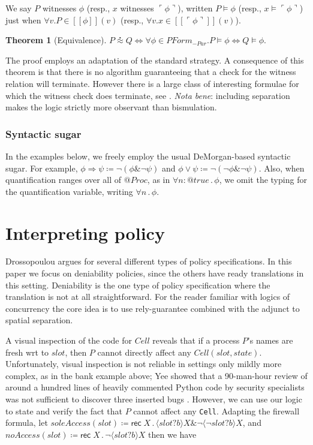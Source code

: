 \documentclass[]{amsart}
\makeatletter
\newcommand{\ldb}{[\![}
\newcommand{\rdb}{]\!]}
\newcommand{\lpquote}{\ulcorner}
\newcommand{\rpquote}{\urcorner}
\newcommand{\quotep}[1]{@#1}
\newcommand{\meaningof}[1]{\ldb #1 \rdb}
\newcommand{\QProc}{\quotep{\mathbin{Proc}}}
\newcommand{\defneqls}{\coloneqq}
\newcommand{\wbbisim}{\stackrel{\centerdot}{\approx}} %
\newcommand{\ptrue}{\mathbin{true}}
\newcommand{\pquotep}[1]{\lpquote #1 \rpquote}
\newcommand{\pprefix}[3]{\langle #1 ? #2 \rangle #3}
\newcommand{\pgfp}[2]{\textsf{rec} \; #1 \mathbin{.} #2}
\newcommand{\pquant}[3]{\forall #1 \mathbin{:} #2 \mathbin{.} #3}
\newcommand{\pquantuntyped}[2]{\forall #1 \mathbin{.} #2}
\newcommand{\riff}{\Leftrightarrow}
\newcommand{\PFormula}{\mathbin{PForm}}
\newtheorem{thm}{Theorem}[subsection]
\theoremstyle{definition}
\theoremstyle{remark}
\numberwithin{equation}{subsection}
\makeatother
\begin{document}
We say $P$ witnesses $\phi$ (resp., $x$ witnesses $\pquotep{\phi}$),
written $P \models \phi$ (resp., $x \models \pquotep{\phi}$) just when
$\forall v . P \in \meaningof{\phi}(v)$ (resp., $\forall v . x \in \meaningof{\pquotep{\phi}}(v)$).

\begin{thm}[Equivalence]\label{sec:equivalence_theorem}
	$P \wbbisim Q \riff \forall \phi \in \PFormula_{-Par} . P \models \phi \riff Q \models \phi .$
\end{thm}

The proof employs an adaptation of the standard strategy. A
consequence of this theorem is that there is no algorithm guaranteeing
that a check for the witness relation will terminate. However there is
a large class of interesting formulae for which the witness check does
terminate, see \cite{DBLP:conf/fossacs/Caires04}. {\em Nota bene}: including
separation makes the logic strictly more observant than bismulation.

\subsubsection{Syntactic sugar }

In the examples below, we freely employ the usual DeMorgan-based
syntactic sugar. For example, $\phi \Rightarrow \psi \defneqls \neg (
\phi \& \neg \psi )$ and $\phi \vee \psi \defneqls \neg ( \neg \phi \&
\neg \psi )$. Also, when quantification ranges over all of $\QProc$,
as in $\pquant{n}{\quotep{\ptrue}}{\phi}$, we omit the typing for the
quantification variable, writing $\pquantuntyped{n}{\phi}$.

\section{Interpreting policy}

Drossopoulou \cite{Drossopoulou:2013:NCP:2489804.2489811} argues for
several different types of policy specifications. In this paper we
focus on deniability policies, since the others have ready
translations in this setting. Deniability is the one type of policy
specification where the translation is not at all straightforward. For
the reader familiar with logics of concurrency the core idea is to use
rely-guarantee combined with the adjunct to spatial separation.

A visual inspection of the code for $Cell$ reveals that if a process
$P$’s names are fresh wrt to $slot$, then $P$ cannot directly affect
any $Cell( slot, state )$. Unfortunately, visual inspection is not
reliable in settings only mildly more complex, as in the bank example
above; Yee showed that a 90-man-hour review of around a hundred lines
of heavily commented Python code by security specialists was not
sufficient to discover three inserted bugs \cite[Section
7]{Yee:EECS-2007-136}.  However, we can use our logic to state and
verify the fact that $P$ cannot affect any {\tt Cell}. Adapting the
firewall formula, let $soleAccess( slot ) \defneqls
\pgfp{X}{\pprefix{slot}{b}{X} \& \neg \pprefix{\neg slot}{b}{X}}$, and
$noAccess( slot ) \defneqls \pgfp{X}{\neg \pprefix{slot}{b}{X}}$ then
we have
\end{document}
